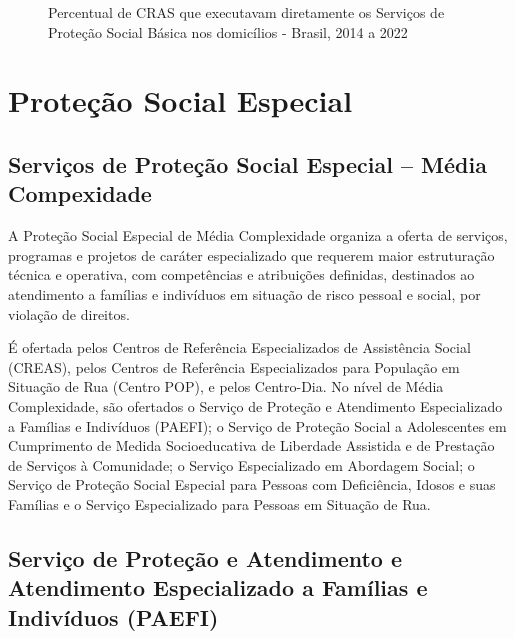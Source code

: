 \documentclass[
  letterpaper,
  DIV=11,
  numbers=noendperiod]{scrreprt}
\begin{document}
\begin{figure}


\caption{\label{fig-CRAS-PSB}Percentual de CRAS que executavam
diretamente os Serviços de Proteção Social Básica nos domicílios -
Brasil, 2014 a 2022}

\end{figure}%

\section{Proteção Social Especial}\label{proteuxe7uxe3o-social-especial}

\subsection{Serviços de Proteção Social Especial -- Média
Compexidade}\label{serviuxe7os-de-proteuxe7uxe3o-social-especial-muxe9dia-compexidade}

A Proteção Social Especial de Média Complexidade organiza a oferta de
serviços, programas e projetos de caráter especializado que requerem
maior estruturação técnica e operativa, com competências e atribuições
definidas, destinados ao atendimento a famílias e indivíduos em situação
de risco pessoal e social, por violação de direitos.

É ofertada pelos Centros de Referência Especializados de Assistência
Social (CREAS), pelos Centros de Referência Especializados para
População em Situação de Rua (Centro POP), e pelos Centro-Dia. No nível
de Média Complexidade, são ofertados o Serviço de Proteção e Atendimento
Especializado a Famílias e Indivíduos (PAEFI); o Serviço de Proteção
Social a Adolescentes em Cumprimento de Medida Socioeducativa de
Liberdade Assistida e de Prestação de Serviços à Comunidade; o Serviço
Especializado em Abordagem Social; o Serviço de Proteção Social Especial
para Pessoas com Deficiência, Idosos e suas Famílias e o Serviço
Especializado para Pessoas em Situação de Rua.

\subsection{Serviço de Proteção e Atendimento e Atendimento
Especializado a Famílias e Indivíduos
(PAEFI)}\label{serviuxe7o-de-proteuxe7uxe3o-e-atendimento-e-atendimento-especializado-a-famuxedlias-e-indivuxedduos-paefi}
\end{document}
